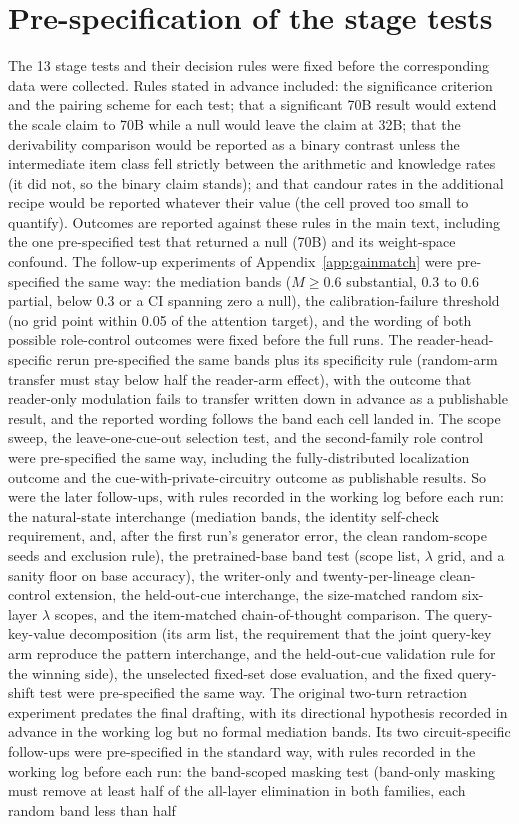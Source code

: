 \documentclass{article}
\begin{document}
\section{Pre-specification of the stage tests}
\label{app:prereg}
The 13 stage tests and their decision rules were fixed before the corresponding data were collected. Rules stated in advance included: the significance criterion and the pairing scheme for each test; that a significant 70B result would extend the scale claim to 70B while a null would leave the claim at 32B; that the derivability comparison would be reported as a binary contrast unless the intermediate item class fell strictly between the arithmetic and knowledge rates (it did not, so the binary claim stands); and that candour rates in the additional recipe would be reported whatever their value (the cell proved too small to quantify). Outcomes are reported against these rules in the main text, including the one pre-specified test that returned a null (70B) and its weight-space confound. The follow-up experiments of Appendix~\ref{app:gainmatch} were pre-specified the same way: the mediation bands ($M \ge 0.6$ substantial, $0.3$ to $0.6$ partial, below $0.3$ or a CI spanning zero a null), the calibration-failure threshold (no grid point within 0.05 of the attention target), and the wording of both possible role-control outcomes were fixed before the full runs. The reader-head-specific rerun pre-specified the same bands plus its specificity rule (random-arm transfer must stay below half the reader-arm effect), with the outcome that reader-only modulation fails to transfer written down in advance as a publishable result, and the reported wording follows the band each cell landed in. The scope sweep, the leave-one-cue-out selection test, and the second-family role control were pre-specified the same way, including the fully-distributed localization outcome and the cue-with-private-circuitry outcome as publishable results. So were the later follow-ups, with rules recorded in the working log before each run: the natural-state interchange (mediation bands, the identity self-check requirement, and, after the first run's generator error, the clean random-scope seeds and exclusion rule), the pretrained-base band test (scope list, $\lambda$ grid, and a sanity floor on base accuracy), the writer-only and twenty-per-lineage clean-control extension, the held-out-cue interchange, the size-matched random six-layer $\lambda$ scopes, and the item-matched chain-of-thought comparison. The query-key-value decomposition (its arm list, the requirement that the joint query-key arm reproduce the pattern interchange, and the held-out-cue validation rule for the winning side), the unselected fixed-set dose evaluation, and the fixed query-shift test were pre-specified the same way. The original two-turn retraction experiment predates the final drafting, with its directional hypothesis recorded in advance in the working log but no formal mediation bands. Its two circuit-specific follow-ups were pre-specified in the standard way, with rules recorded in the working log before each run: the band-scoped masking test (band-only masking must remove at least half of the all-layer elimination in both families, each random band less than half 
\end{document}
